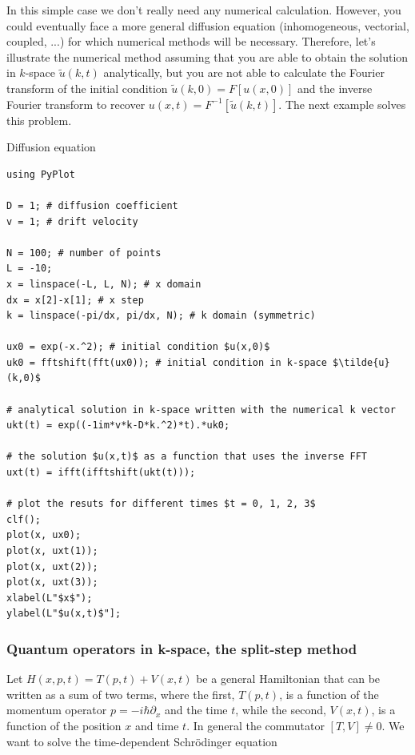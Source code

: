 In this simple case we don't really need any numerical calculation. However, you could eventually face a more general diffusion equation (inhomogeneous, vectorial, coupled, ...) for which numerical methods will be necessary. Therefore, let's illustrate the numerical method assuming that you are able to obtain the solution in $k$-space $\tilde{u}(k,t)$ analytically, but you are not able to calculate the Fourier transform of the initial condition  $\tilde{u}(k,0) =  F[u(x,0)]$ and the inverse Fourier transform to recover $u(x,t) = F^{-1}[\tilde{u}(k,t)]$. The next example solves this problem.

\begin{example}{Diffusion equation}
\label{ex:diffusion}
\begin{verbatim}
using PyPlot

D = 1; # diffusion coefficient
v = 1; # drift velocity

N = 100; # number of points
L = -10; 
x = linspace(-L, L, N); # x domain
dx = x[2]-x[1]; # x step
k = linspace(-pi/dx, pi/dx, N); # k domain (symmetric)

ux0 = exp(-x.^2); # initial condition $u(x,0)$
uk0 = fftshift(fft(ux0)); # initial condition in k-space $\tilde{u}(k,0)$

# analytical solution in k-space written with the numerical k vector
ukt(t) = exp((-1im*v*k-D*k.^2)*t).*uk0;

# the solution $u(x,t)$ as a function that uses the inverse FFT
uxt(t) = ifft(ifftshift(ukt(t)));

# plot the resuts for different times $t = 0, 1, 2, 3$
clf();
plot(x, ux0);
plot(x, uxt(1));
plot(x, uxt(2));
plot(x, uxt(3));
xlabel(L"$x$");
ylabel(L"$u(x,t)$"];
\end{verbatim}
\end{example}

\subsubsection{Quantum operators in k-space, the split-step method}


Let $H(x,p,t) = T(p,t) + V(x,t)$ be a general Hamiltonian that can be written as a sum of two terms, where the first, $T(p,t)$, is a function of the momentum operator $p = -i\hbar\partial_x$ and the time $t$, while the second, $V(x,t)$, is a function of the position $x$ and time $t$. In general the commutator $[T,V] \neq 0$. We want to solve the time-dependent Schrödinger equation


